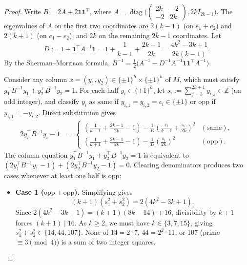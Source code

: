\documentclass[11pt]{article}
\theoremstyle{remark}
\newcommand{\Z}{\mathbb{Z}}
\begin{document}
\begin{proof}
Write $B = 2 A + 2 \mathbf{1}\mathbf{1}^\top$, where $A = \operatorname{diag}\!\bigl(\begin{pmatrix} 2k & -2 \\ -2 & 2k \end{pmatrix}, 2k I_{2k-1}\bigr)$. The eigenvalues of $A$ on the first two coordinates are $2(k - 1)$ (on $e_1 + e_2$) and $2(k + 1)$ (on $e_1 - e_2$), and $2k$ on the remaining $2k - 1$ coordinates. Let
\[
  D := 1 + \mathbf{1}^\top A^{-1} \mathbf{1}
  = 1 + \frac{1}{k - 1} + \frac{2k - 1}{2k}
  = \frac{4k^2 - 3k + 1}{2k(k - 1)}.
\]
By the Sherman--Morrison formula, $B^{-1} = \frac{1}{2}\bigl(A^{-1} - D^{-1} A^{-1}\mathbf{1}\mathbf{1}^\top A^{-1}\bigr)$.

Consider any column $x = (y_1, y_2) \in \{\pm 1\}^h \times \{\pm 1\}^h$ of $M$, which must satisfy $y_1^\top B^{-1} y_1 + y_2^\top B^{-1} y_2 = 1$. For each half $y_i \in \{\pm 1\}^h$, let $s_i := \sum_{j=3}^{2k+1} y_{i,j} \in \Z$ (an odd integer), and classify $y_i$ as $\mathrm{same}$ if $y_{i,1} = y_{i,2} = \epsilon_i \in \{\pm 1\}$ or $\mathrm{opp}$ if $y_{i,1} = -y_{i,2}$. Direct substitution gives
\begin{align*}
  2 y_i^\top B^{-1} y_i - 1
  &= \begin{cases}
    \displaystyle \left(\frac{1}{k - 1} + \frac{2k - 1}{2k} - 1\right) - \frac{1}{D}\left(\frac{\epsilon_i}{k - 1} + \frac{s_i}{2k}\right)^2 & (\mathrm{same}), \\[10pt]
    \displaystyle \left(\frac{1}{k + 1} + \frac{2k - 1}{2k} - 1\right) - \frac{1}{D}\left(\frac{s_i}{2k}\right)^2 & (\mathrm{opp}).
  \end{cases}
\end{align*}
The column equation $y_1^\top B^{-1} y_1 + y_2^\top B^{-1} y_2 = 1$ is equivalent to $(2 y_1^\top B^{-1} y_1 - 1) + (2 y_2^\top B^{-1} y_2 - 1) = 0$. Clearing denominators produces two cases whenever at least one half is $\mathrm{opp}$:

\begin{itemize}[leftmargin=*,topsep=3pt,itemsep=2pt]
\item \textbf{Case 1 ($\mathrm{opp} + \mathrm{opp}$).} Simplifying gives
\[
  (k + 1)(s_1^2 + s_2^2) = 2(4k^2 - 3k + 1).
\]
Since $2(4k^2 - 3k + 1) = (k + 1)(8k - 14) + 16$, divisibility by $k + 1$ forces $(k + 1) \mid 16$. As $k \ge 2$, we must have $k \in \{3, 7, 15\}$, giving $s_1^2 + s_2^2 \in \{14, 44, 107\}$. None of $14 = 2 \cdot 7$, $44 = 2^2 \cdot 11$, or $107$ (prime $\equiv 3 \pmod 4$) is a sum of two integer squares.


\end{itemize}
\end{proof}
\end{document}
